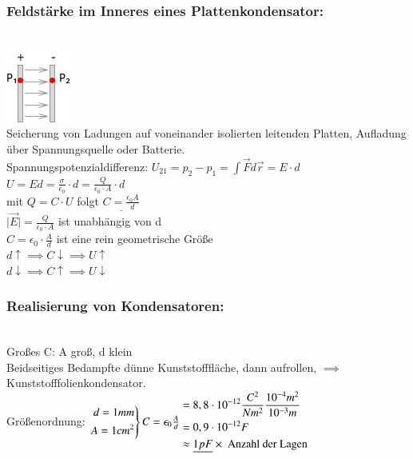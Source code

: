 \documentclass[11pt]{article}
\begin{document}
\subsubsection{Feldstärke im Inneres eines Plattenkondensator:}

\hfill\\
\includegraphics{skizzen/14/14_8B7}
\hfill\\

Seicherung von Ladungen auf voneinander isolierten leitenden Platten, Aufladung über Spannungsquelle oder Batterie.\\

Spannungspotenzialdifferenz: $ U_{21}=p_2-p_1=\int \vec{F}d\vec{r}=E\cdot d $\\
$ U = Ed=\frac{\sigma}{\epsilon_0}\cdot d = \frac{Q}{\epsilon_0\cdot A}\cdot d $\\
mit $Q=C\cdot U$ folgt $ \underline{C=\frac{\epsilon_0 A}{d}} $\\

$\boxed{\vert\vec{E}\vert=\frac{Q}{\epsilon_0\cdot A}}$ ist unabhängig von d\\

$\boxed{C=\epsilon_0\cdot \frac{A}{d}}$ ist eine rein geometrische Größe\\

$d\uparrow \implies C\downarrow \implies U\uparrow$\\

$d\downarrow \implies C\uparrow \implies U \downarrow$\\


\subsubsection{Realisierung von Kondensatoren:}\\

Großes C: A groß, d klein\\
Beidseitiges Bedampfte dünne Kunststofffläche, dann aufrollen, $\implies$ Kunststofffolienkondensator.\\

Größenordnung: $\begin{equation} \left. \begin{aligned} d=1mm\\ A=1cm^2\end{aligned}\right\}C=\epsilon_0\frac{A}{d}\end{equation}\\
	 \begin{align*}&=8,8\cdot 10^{-12}\frac{C^2}{Nm^2}\frac{10^{-4}m^2}{10^{-3}m}\\
	 &=0,9\cdot 10^{-12}F\\
	 &\approx \underline{1pF} \times \text{ Anzahl der Lagen}
	 \end{align*}$
\end{document}
